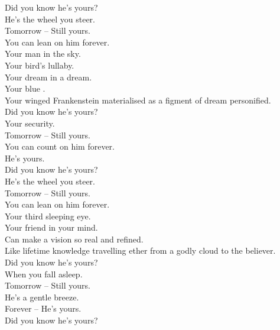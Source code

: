 
\label{album:butterfly-3000}




Did you know he's yours? \\
He's the wheel you steer. \\
Tomorrow -- Still yours. \\
You can lean on him forever. \\

Your man in the sky. \\
Your bird's lullaby. \\
Your dream in a dream. \\
Your blue . \\
Your winged Frankenstein materialised as a figment of dream personified. \\

Did you know he's yours? \\
Your security. \\
Tomorrow -- Still yours. \\
You can count on him forever. \\
He's yours. \\

Did you know he's yours? \\
He's the wheel you steer. \\
Tomorrow -- Still yours. \\
You can lean on him forever. \\

Your third sleeping eye. \\
Your friend in your mind. \\
Can make a vision so real and refined. \\
Like lifetime knowledge travelling ether from a godly cloud to the believer. \\

Did you know he's yours? \\
When you fall asleep. \\
Tomorrow -- Still yours. \\
He's a gentle breeze. \\
Forever -- He's yours. \\

Did you know he's yours? \\

